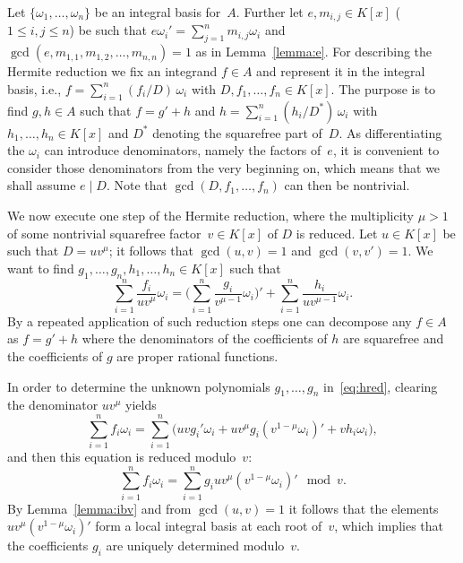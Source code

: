 \documentclass[final,1p,times,authoryear]{elsarticle}
\begin{document}
Let $\{\omega_1,\ldots,\omega_n\}$ be an integral basis for~$A$.
Further let $e,m_{i,j}\in K[x]$ ($1\leq i,j\leq n$) be such that
$e\omega_i'=\sum_{j=1}^n m_{i,j}\omega_i$ and
$\gcd(e,m_{1,1},m_{1,2},\ldots,m_{n,n})=1$ as in Lemma~\ref{lemma:e}. For describing
the Hermite reduction we fix an integrand $f\in A$ and represent it in the
integral basis, i.e., $f=\sum_{i=1}^n (f_i/D)\,\omega_i$ with
$D,f_1,\ldots,f_n\in K[x]$. The purpose is to find $g,h\in A$ such that
$f=g'+h$ and $h=\sum_{i=1}^n(h_i/D^\ast)\,\omega_i$ with $h_1,\ldots,h_n\in K[x]$
and $D^\ast$ denoting the squarefree part of~$D$.
As differentiating the $\omega_i$ can introduce
denominators, name\-ly the factors of~$e$, it is convenient to consider those
denominators from the very beginning on, which means that we shall assume
$e\mid D$. Note that $\gcd(D,f_1,\ldots,f_n)$ can then be nontrivial.

We now execute one step of the Hermite reduction, where the multiplicity
$\mu>1$ of some nontrivial squarefree factor~$v\in K[x]$ of $D$ is reduced.
Let $u\in K[x]$ be such that $D=uv^\mu$; it follows that $\gcd(u,v)=1$ and
$\gcd(v,v')=1$. We want to find $g_1,\ldots,g_n,h_1,\ldots,h_n\in K[x]$
such that
\begin{equation}\label{eq:hred}
  \sum_{i=1}^n \frac{f_i}{uv^\mu}\omega_i =
  \biggl(\sum_{i=1}^n\frac{g_i}{v^{\mu-1}}\omega_i\biggr)' +
  \sum_{i=1}^n \frac{h_i}{uv^{\mu-1}}\omega_i.
\end{equation}
By a repeated application of such reduction steps one can decompose any $f\in A$
as $f=g'+h$ where the denominators of the coefficients of $h$ are squarefree
and the coefficients of $g$ are proper rational functions.

In order to determine the unknown polynomials $g_1,\ldots,g_n$ in~\eqref{eq:hred},
clearing the denominator $uv^\mu$ yields
\begin{equation}\label{eq:clear}
  \sum_{i=1}^n f_i\omega_i = \sum_{i=1}^n \biggl( uvg_i'\omega_i +
  uv^\mu g_i\left(v^{1-\mu}\omega_i\right)' + vh_i\omega_i \biggr),
\end{equation}
and then this equation is reduced modulo~$v$:
\begin{equation}\label{eq:modv}
  \sum_{i=1}^n f_i\omega_i =
  \sum_{i=1}^n g_iuv^\mu\left(v^{1-\mu}\omega_i\right)' \mod v.
\end{equation}
By Lemma~\ref{lemma:ibv} and from $\gcd(u,v)=1$ it follows that
the elements $uv^\mu\left(v^{1-\mu}\omega_i\right)'$ form a local integral basis
at each root of~$v$, which implies that the coefficients $g_i$ are
uniquely determined modulo~$v$.
\end{document}
